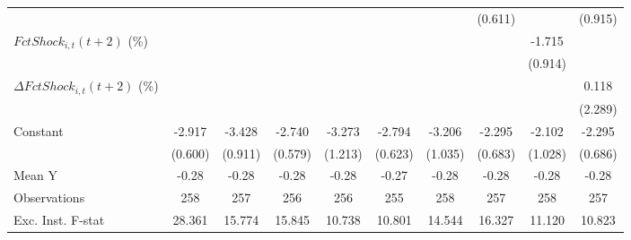 {\begin{tabular}{l*{9}{c}}
                    &                     &                     &                     &                     &                     &                     &     (0.611)         &                     &     (0.915)         \\
\addlinespace
$ FctShock_{i,t}(t+2)$ (\%)&                     &                     &                     &                     &                     &                     &                     &      -1.715\sym{*}  &                     \\
                    &                     &                     &                     &                     &                     &                     &                     &     (0.914)         &                     \\
\addlinespace
$ \Delta FctShock_{i,t}(t+2)$ (\%)&                     &                     &                     &                     &                     &                     &                     &                     &       0.118         \\
                    &                     &                     &                     &                     &                     &                     &                     &                     &     (2.289)         \\
\addlinespace
Constant            &      -2.917\sym{***}&      -3.428\sym{***}&      -2.740\sym{***}&      -3.273\sym{**} &      -2.794\sym{***}&      -3.206\sym{***}&      -2.295\sym{***}&      -2.102\sym{*}  &      -2.295\sym{***}\\
                    &     (0.600)         &     (0.911)         &     (0.579)         &     (1.213)         &     (0.623)         &     (1.035)         &     (0.683)         &     (1.028)         &     (0.686)         \\
\midrule
Mean Y              &       -0.28         &       -0.28         &       -0.28         &       -0.28         &       -0.27         &       -0.28         &       -0.28         &       -0.28         &       -0.28         \\
Observations        &         258         &         257         &         256         &         256         &         255         &         258         &         257         &         258         &         257         \\
Exc. Inst. F-stat   &      28.361         &      15.774         &      15.845         &      10.738         &      10.801         &      14.544         &      16.327         &      11.120         &      10.823         \\
\bottomrule
\end{tabular}
}
